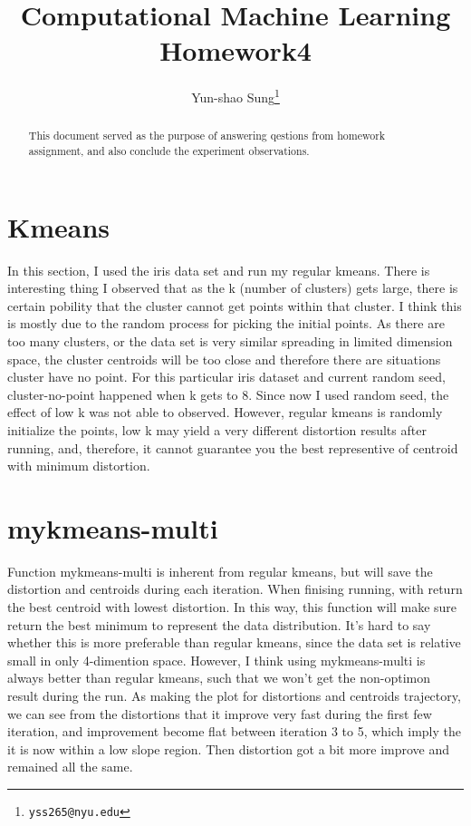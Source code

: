 \documentclass[final]{siamltexmm}
\title{Computational Machine Learning Homework4}
\author{Yun-shao Sung\thanks{\tt yss265@nyu.edu}}
\begin{document}
\maketitle

\begin{abstract}
This document served as the purpose of answering qestions from homework assignment, and also conclude the experiment observations.
\end{abstract}

\pagestyle{myheadings}
\thispagestyle{plain}

\section{Kmeans}
In this section, I used the iris data set and run my regular kmeans. There is interesting thing I observed that as the k (number of clusters) gets large, there is certain pobility that the cluster cannot get points within that cluster. I think this is mostly due to the random process for picking the initial points. As there are too many clusters, or the data set is very similar spreading in limited dimension space, the cluster centroids will be too close and therefore there are situations cluster have no point. For this particular iris dataset and current random seed, cluster-no-point happened when k gets to 8. Since now I used random seed, the effect of low k was not able to observed. However, regular kmeans is randomly initialize the points, low k may yield a very different distortion results after running, and, therefore, it cannot guarantee you the best representive of centroid with minimum distortion.

\section{mykmeans-multi}
Function mykmeans-multi is inherent from regular kmeans, but will save the distortion and centroids during each iteration. When finising running, with return the best centroid with lowest distortion. In this way, this function will make sure return the best minimum to represent the data distribution. It's hard to say whether this is more preferable than regular kmeans, since the data set is relative small in only 4-dimention space. However, I think using mykmeans-multi is always better than regular kmeans, such that we won't get the non-optimon result during the run. As making the plot for distortions and centroids trajectory, we can see from the distortions that it improve very fast during the first few iteration, and improvement become flat between iteration 3 to 5, which imply the it is now within a low slope region. Then distortion got a bit more improve and remained all the same.
\end{document}
